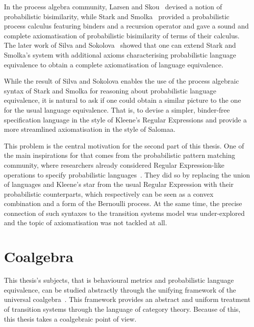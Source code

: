 In the process algebra community, Larsen and Skou~\cite{Larsen:1991:Bisimulation} devised a notion of probabilistic bisimilarity, while Stark and Smolka~\cite{Stark:2000:Complete} provided a probabilistic process calculus featuring binders and a recursion operator and gave a sound and complete axiomatisation of probabilistic bisimilarity of terms of their calculus. The later work of Silva and Sokolova~\cite{Silva:2011:Sound} showed that one can extend Stark and Smolka's system with additional axioms characterising probabilistic language equivalence to obtain a complete axiomatisation of language equivalence.

While the result of Silva and Sokolova enables the use of the process algebraic syntax of Stark and Smolka for reasoning about probabilistic language equivalence, it is natural to ask if one could obtain a similar picture to the one for the usual language equivalence. That is, to devise a simpler, binder-free specification language in the style of Kleene's Regular Expressions and provide a more streamlined axiomatisation in the style of Salomaa.
	
	This problem is the central motivation for the second part of this thesis. One of the main inspirations for that comes from the probabilistic pattern matching community, where researchers already considered Regular Expression-like operations to specify probabilistic languages~\cite{Ross:2000:Probabilistic}. They did so by replacing the union of languages and Kleene's star from the usual Regular Expression with their probabilistic counterparts, which respectively can be seen as a convex combination and a form of the Bernoulli process. At the same time, the precise connection of such syntaxes to the transition systems model was under-explored~\cite{Beeh:2017:Transformations} and the topic of axiomatisation was not tackled at all. 


\section{Coalgebra}
This thesis's subjects, that is behavioural metrics and probabilistic language equivalence, can be studied abstractly through the unifying framework of the universal coalgebra~\cite{Gumm:2000:Elements,Rutten:2000:Universal}. This framework provides an abstract and uniform treatment of transition systems through the language of category theory. Because of this, this thesis takes a coalgebraic point of view.

